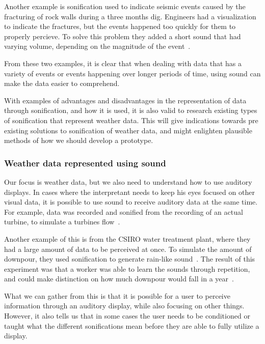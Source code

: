 Another example is sonification used to indicate seismic events caused by the fracturing of rock walls during a three months dig. Engineers had a visualization to indicate the fractures, but the events happened too quickly for them to properly percieve. To solve this problem they added a short sound that had varying volume, depending on the magnitude of the event~\cite*[pp.24]{Barrass1999}.

From these two examples, it is clear that when dealing with data that has a variety of events or events happening over longer periods of time, using sound can make the data easier to comprehend.


With examples of advantages and disadvantages in the representation of data through sonification, and how it is used, it is also valid to research existing types of sonification that represent weather data. This will give indications towards pre existing solutions to sonification of weather data, and might enlighten plausible methods of how we should develop a prototype.


\subsubsection{Weather data represented using sound} %
\label{ssub:weather_data_represented_using_sound}

Our focus is weather data, but we also need to understand how to use auditory displays. In cases where the interpretant needs to keep his eyes focused on other visual data, it is possible to use sound to receive auditory data at the same time. For example, data was recorded and sonified from the recording of an actual turbine, to simulate a turbines flow~\cite*{Kramer1993}.

Another example of this is from the CSIRO water treatment plant, where they had a large amount of data to be perceived at once. To simulate the amount of downpour, they used sonification to generate rain-like sound~\cite*[pp.24-25]{Barrass1999}.
The result of this experiment was that a worker was able to learn the sounds through repetition, and could make distinction on how much downpour would fall in a year~\cite*[pp.24-25]{Barrass1999}.

What we can gather from this is that it is possible for a user to perceive information through an auditory display, while also focusing on other things. However, it also tells us that in some cases the user needs to be conditioned or taught what the different sonifications mean before they are able to fully utilize a display.

